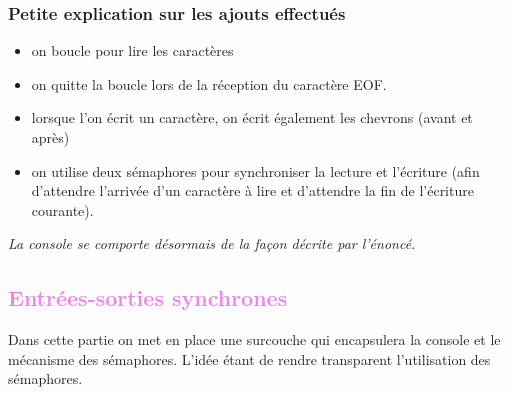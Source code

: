 \documentclass[a4paper,10pt]{report}
\begin{document}
  \textcolor{TealBlue}{\subsubsection*{Petite explication sur les ajouts effectués}}
\begin{itemize}
 \item on boucle pour lire les caractères
 \item on quitte la boucle lors de la réception du caractère EOF.
 \item lorsque l'on écrit un caractère, on écrit également les chevrons (avant et après)
 \item on utilise deux sémaphores pour synchroniser la lecture et l'écriture 
 (afin d'attendre l'arrivée d'un caractère à lire et d'attendre la fin de l'écriture courante).
\end{itemize}
\emph{La console se comporte désormais de la façon décrite par l'énoncé.}

\textcolor{Violet}{\section{Entrées-sorties synchrones}}
  Dans cette partie on met en place une surcouche qui encapsulera la console et le mécanisme des sémaphores. L'idée étant de rendre transparent l'utilisation 
  des sémaphores.
  
\end{document}
